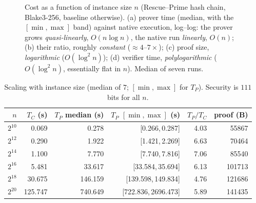 \documentclass[11pt]{article}
\begin{document}
\begin{figure}[htbp]\centering
{}
\caption{Cost as a function of instance size $n$ (Rescue--Prime hash chain, Blake3-256, baseline
otherwise). (a) prover time (median, with the $[\min,\max]$ band) against native execution, log--log:
the prover grows \emph{quasi-linearly}, $O(n\log n)$, the native run \emph{linearly}, $O(n)$;
(b) their ratio, roughly \emph{constant} ($\approx 4\text{--}7\times$); (c) proof size, \emph{logarithmic}
($O(\log^2 n)$); (d) verifier time, \emph{polylogarithmic} ($O(\log^2 n)$, essentially flat in $n$).
Median of seven runs.}
\label{fig:scaling}
\end{figure}

\begin{table}[htbp]\centering\footnotesize
\caption{Scaling with instance size (median of $7$; $[\min,\max]$ for $T_P$). Security is $111$ bits
for all $n$.}
\label{tab:scaling}
\begin{tabular}{r r r r r r}
\toprule
$n$ & $T_C$ (s) & $T_P$ median (s) & $T_P$ $[\min,\max]$ (s) & $T_P/T_C$ & proof (B) \\
\midrule
$2^{10}$ & 0.069   & 0.278   & [0.266,\,0.287]      & 4.03 & \num{55867}  \\
$2^{12}$ & 0.290   & 1.922   & [1.421,\,2.269]      & 6.63 & \num{70464}  \\
$2^{14}$ & 1.100   & 7.770   & [7.740,\,7.816]      & 7.06 & \num{85540}  \\
$2^{16}$ & 5.481   & 33.617  & [33.584,\,35.694]    & 6.13 & \num{101713} \\
$2^{18}$ & 30.675  & 146.159 & [139.598,\,149.834]  & 4.76 & \num{121686} \\
$2^{20}$ & 125.747 & 740.649 & [722.836,\,2696.473] & 5.89 & \num{141435} \\
\bottomrule
\end{tabular}
\end{table}
\end{document}

